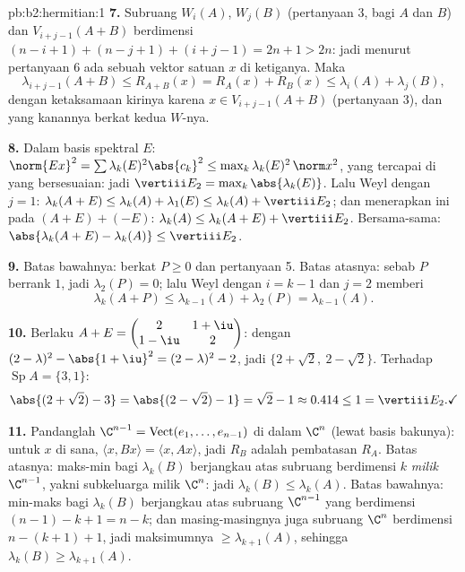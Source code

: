 \begin{solution}{pb:b2:hermitian:1}
\textbf{7.} Subruang $W_i(A)$, $W_j(B)$ (pertanyaan 3, bagi
$A$ dan $B$) dan $V_{i+j-1}(A+B)$ berdimensi $(n-i+1) +
(n-j+1) + (i+j-1) = 2n + 1 > 2n$: jadi menurut pertanyaan 6 ada sebuah
vektor satuan $x$ di ketiganya. Maka
\[
\lambda_{i+j-1}(A+B) \leq R_{A+B}(x)
= R_A(x) + R_B(x) \leq \lambda_i(A) + \lambda_j(B),
\]
dengan ketaksamaan kirinya karena $x \in V_{i+j-1}(A+B)$ (pertanyaan
3), dan yang kanannya berkat kedua $W$-nya.

\textbf{8.} Dalam basis spektral $E$: $\norm{Ex}^2 = \sum
\lambda_k(E)^2\abs{c_k}^2 \leq \max_k\lambda_k(E)^2\,\norm
x^2$, yang tercapai di  yang bersesuaian: jadi $\vertiii E_2
= \max_k\abs{\lambda_k(E)}$. Lalu Weyl dengan $j = 1$: $\lambda_k(A+E)
\leq \lambda_k(A) + \lambda_1(E) \leq \lambda_k(A) + \vertiii
E_2$; dan menerapkan ini pada $(A+E) + (-E)$: $\lambda_k(A) \leq
\lambda_k(A+E) + \vertiii E_2$. Bersama-sama:
$\abs{\lambda_k(A+E) - \lambda_k(A)} \leq \vertiii E_2$.

\textbf{9.} Batas bawahnya: berkat $P \geq 0$ dan pertanyaan 5. Batas atasnya: sebab $P$
berrank $1$, jadi $\lambda_2(P) = 0$; lalu Weyl dengan $i = k-1$ dan $j =
2$ memberi
\[
\lambda_k(A + P) \leq \lambda_{k-1}(A) + \lambda_2(P)
= \lambda_{k-1}(A) .
\]

\textbf{10.} Berlaku $A + E = \begin{pmatrix} 2 & 1+\iu\\ 1-\iu &
2\end{pmatrix}$: dengan  $(2-\lambda)^2 -
\abs{1+\iu}^2 = (2-\lambda)^2 - 2$, jadi  $\{2 + \sqrt2,\ 2
- \sqrt2\}$. Terhadap $\operatorname{Sp}A = \{3, 1\}$:
\[
\abs{(2+\sqrt2) - 3} = \abs{(2-\sqrt2) - 1} = \sqrt2 - 1
\approx 0.414 \leq 1 = \vertiii E_2 . \checkmark
\]

\textbf{11.} Pandanglah $\C^{n-1} = \operatorname{Vect}(e_1, \dots,
e_{n-1})$ di dalam $\C^n$ (lewat basis bakunya): untuk $x$ di sana,
$\langle x, Bx\rangle = \langle x, Ax\rangle$, jadi $R_B$ adalah
pembatasan $R_A$. Batas atasnya: maks-min bagi $\lambda_k
(B)$ berjangkau atas subruang berdimensi $k$ \emph{milik}
$\C^{n-1}$, yakni subkeluarga milik $\C^n$: jadi $\lambda_k(B) \leq
\lambda_k(A)$. Batas bawahnya: min-maks bagi $\lambda_k(B)$
berjangkau atas subruang $\C^{n-1}$ yang berdimensi $(n-1)-k+1 =
n-k$; dan masing-masingnya juga subruang $\C^n$ berdimensi $n -
(k+1) + 1$, jadi maksimumnya $\geq \lambda_{k+1}(A)$, sehingga
$\lambda_k(B) \geq \lambda_{k+1}(A)$.


\end{solution}
